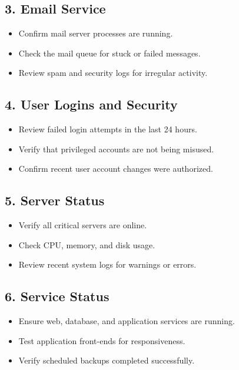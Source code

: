 \documentclass[12pt,a4paper]{article}
\begin{document}
\subsection{3. Email Service}
\begin{itemize}[leftmargin=1.5em]
    \item Confirm mail server processes are running.
    \item Check the mail queue for stuck or failed messages.
    \item Review spam and security logs for irregular activity.
\end{itemize}

\subsection{4. User Logins and Security}
\begin{itemize}[leftmargin=1.5em]
    \item Review failed login attempts in the last 24 hours.
    \item Verify that privileged accounts are not being misused.
    \item Confirm recent user account changes were authorized.
\end{itemize}

\subsection{5. Server Status}
\begin{itemize}[leftmargin=1.5em]
    \item Verify all critical servers are online.
    \item Check CPU, memory, and disk usage.
    \item Review recent system logs for warnings or errors.
\end{itemize}

\subsection{6. Service Status}
\begin{itemize}[leftmargin=1.5em]
    \item Ensure web, database, and application services are running.
    \item Test application front-ends for responsiveness.
    \item Verify scheduled backups completed successfully.
\end{itemize}
\end{document}
